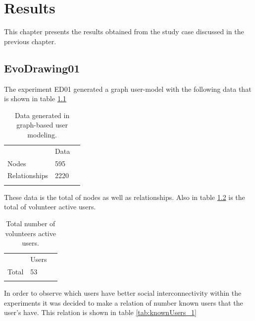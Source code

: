 \chapter{Results} \label{sec:6} This chapter presents the results obtained from 
the study case discussed in the previous chapter.

\section{EvoDrawing01}

The experiment ED01 generated a graph user-model with the following data
that is shown in table \ref{tab:dataGenerated_1}

\begin{table}
\small
\caption{Data generated in graph-based user modeling.}
\label{tab:dataGenerated_1}
\centering
\small
\begin{tabular}{p{3cm} p{3cm} p{3cm} }
\hline\noalign{\smallskip}
  & Data &  \\
\noalign{\smallskip}\hline\noalign{\smallskip}
\small{Nodes} & \small{595} & \\ \hline
\small{Relationships} & \small{2220} & \\ \hline

\noalign{\smallskip}\hline
\end{tabular}
\end{table}


These data is the total of nodes as well as relationships. Also in
table \ref{tab:totalUsers_12} is the total of volunteer active users.

\begin{table}
\small
\caption{Total number of volunteers active users.}
\label{tab:totalUsers_12}
\centering
\small
\begin{tabular}{p{3cm} p{3cm} p{3cm} }
\hline\noalign{\smallskip}
  & Users &  \\
\noalign{\smallskip}\hline\noalign{\smallskip}
\small{Total } & \small{53} & \\ \hline
\noalign{\smallskip}\hline
\end{tabular}
\end{table}

In order to observe which users have better social interconnectivity within the
experiments it was decided to make a relation of number known users that the
user’s have. This relation is shown in table \ref{tab:knownUsers_1}

